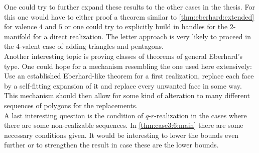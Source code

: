 One could try to further expand these results to the other cases in the thesis. For this one would have to either proof a theorem similar to \autoref{thm:eberhard:extended} for valence $4$ and $5$ or one could try to explicitly build in handles for the $2$-manifold for a direct realization. The letter approach is very likely to proceed in the $4$-valent case of adding triangles and pentagons.\\
Another interesting topic is proving classes of theorems of general Eberhard's type. One could hope for a mechanism resembling the one used here extensively: Use an established Eberhard-like theorem for a first realization, replace each face by a self-fitting expansion of it and replace every unwanted face in some way. This mechanism should then allow for some kind of alteration to many different sequences of polygons for the replacements. \\
A last interesting question is the condition of $q$-$r$-realization in the cases where there are some non-realizable sequences. In \autoref{thm:case3:6:main} there are some necessary conditions given. It would be interesting to lower the bounds even further or to strengthen the result in case these are the lower bounds.